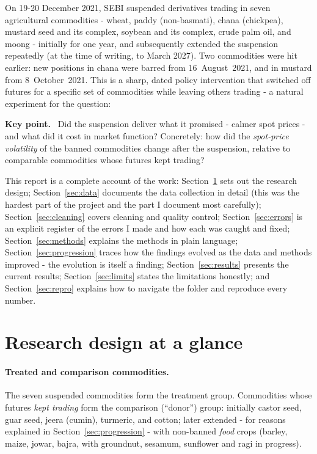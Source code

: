 \documentclass[11pt]{article}
\newenvironment{keybox}
  {\begin{framed}\noindent\textbf{Key point.}\ }
  {\end{framed}}
\begin{document}
On 19-20 December 2021, SEBI suspended derivatives trading in seven agricultural
commodities - wheat, paddy (non-basmati), chana (chickpea), mustard seed and its
complex, soybean and its complex, crude palm oil, and moong - initially for one year,
and subsequently extended the suspension repeatedly (at the time of writing, to March
2027). Two commodities were hit earlier: new positions in chana were barred from
16~August~2021, and in mustard from 8~October~2021. This is a sharp, dated policy
intervention that switched off futures for a specific set of commodities while leaving
others trading - a natural experiment for the question:

\begin{keybox}
Did the suspension deliver what it promised - calmer spot prices - and what did it
cost in market function? Concretely: how did the \emph{spot-price volatility} of the
banned commodities change after the suspension, relative to comparable commodities whose
futures kept trading?
\end{keybox}

This report is a complete account of the work: Section~\ref{sec:design} sets out the
research design; Section~\ref{sec:data} documents the data collection in detail (this was
the hardest part of the project and the part I document most carefully);
Section~\ref{sec:cleaning} covers cleaning and quality control;
Section~\ref{sec:errors} is an explicit register of the errors I made and how each was
caught and fixed; Section~\ref{sec:methods} explains the methods in plain language;
Section~\ref{sec:progression} traces how the findings evolved as the data and methods
improved - the evolution is itself a finding; Section~\ref{sec:results} presents the
current results; Section~\ref{sec:limits} states the limitations honestly; and
Section~\ref{sec:repro} explains how to navigate the folder and reproduce every number.

\section{Research design at a glance}
\label{sec:design}

\paragraph{Treated and comparison commodities.} The seven suspended commodities form the
treatment group. Commodities whose futures \emph{kept trading} form the comparison
(``donor'') group: initially castor seed, guar seed, jeera (cumin), turmeric, and cotton;
later extended - for reasons explained in Section~\ref{sec:progression} - with
non-banned \emph{food} crops (barley, maize, jowar, bajra, with groundnut, sesamum,
sunflower and ragi in progress).
\end{document}
